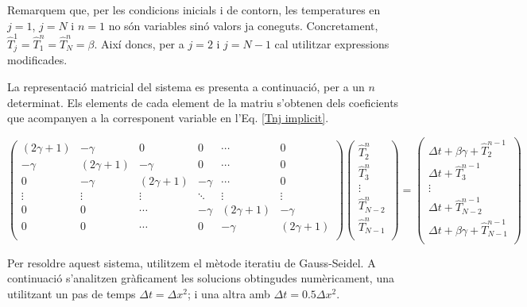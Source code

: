 \documentclass[11pt]{article}
\begin{document}
Remarquem que, per les condicions inicials i de contorn, les temperatures en $j=1$, $j=N$ i $n=1$ no són variables sinó valors ja coneguts. Concretament, $\hat{T}_j^1=\hat{T}_1^n=\hat{T}_N^n = \beta$. Així doncs, per a $j=2$ i $j=N-1$ cal utilitzar expressions modificades.

La representació matricial del sistema es presenta a continuació, per a un $n$ determinat. Els elements de cada element de la matriu s'obtenen dels coeficients que acompanyen a la corresponent variable en l'Eq. \eqref{Tnj implicit}.

\begin{equation}
  \begin{pmatrix}
    (2\gamma + {1}) & {-\gamma} & {0} & {0} & \cdots & {0} \\
    {-\gamma} & (2\gamma + {1}) & {-\gamma} & {0} & \cdots & {0} \\
    {0} & {-\gamma} & (2\gamma + {1}) & {-\gamma} & \cdots & {0} \\
    \vdots & \vdots & \vdots & \ddots & \vdots & \vdots \\
    {0} & {0} & \cdots & {-\gamma} & (2\gamma + {1}) & {-\gamma} \\
    {0} & {0} & \cdots & {0} & {-\gamma} & (2\gamma + {1}) \\
  \end{pmatrix}
  \begin{pmatrix}
    \hat{T}_{2}^{n} \\
    \hat{T}_{3}^{n} \\
    \vdots \\
    \hat{T}_{N-2}^{n} \\
    \hat{T}_{N-1}^{n} \\
  \end{pmatrix}
  =
  \begin{pmatrix}
    \Delta t + \beta\gamma + \hat{T}^{n-1}_2 \\
    \Delta t + \hat{T}^{n-1}_3 \\
    \vdots \\
    \Delta t + \hat{T}^{n-1}_{N-2} \\
    \Delta t + \beta\gamma + \hat{T}^{n-1}_{N-1} \\
  \end{pmatrix}
  \label{matriu implicit}
\end{equation}

Per resoldre aquest sistema, utilitzem el mètode iteratiu de Gauss-Seidel. A continuació s'analitzen gràficament les solucions obtingudes numèricament, una utilitzant un pas de temps $\Delta t = \Delta x^2$; i una altra amb $\Delta t = 0.5\Delta x^2$.
\end{document}
